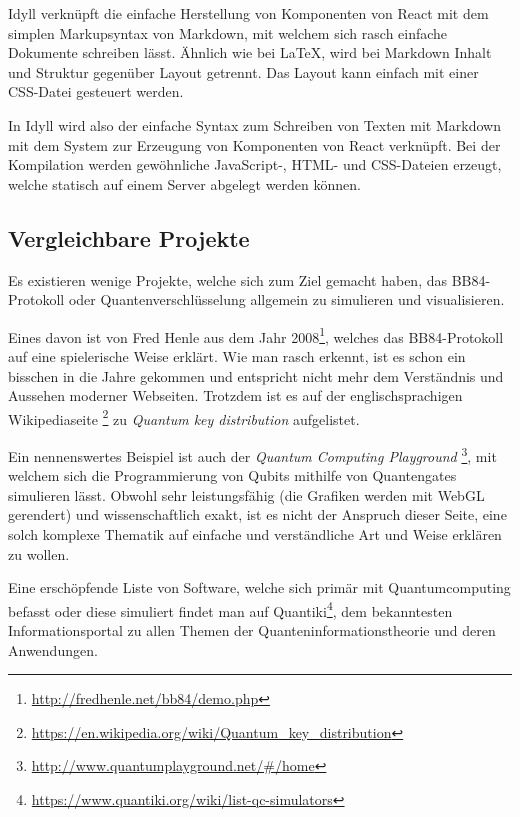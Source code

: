 \documentclass[a4paper,10.2pt,pdftex]{scrartcl}%
\begin{document}
Idyll verknüpft die einfache Herstellung von Komponenten von React mit dem simplen Markupsyntax von Markdown, mit welchem sich rasch einfache Dokumente schreiben lässt. Ähnlich wie bei LaTeX, wird bei Markdown Inhalt und Struktur gegenüber Layout getrennt. Das Layout kann einfach mit einer CSS-Datei gesteuert werden.

In Idyll wird also der einfache Syntax zum Schreiben von Texten mit Markdown mit dem System zur Erzeugung von Komponenten von React verknüpft. Bei der Kompilation werden gewöhnliche JavaScript-, HTML- und CSS-Dateien erzeugt, welche statisch auf einem Server abgelegt werden können.
\subsection{Vergleichbare Projekte}
Es existieren wenige Projekte, welche sich zum Ziel gemacht haben, das BB84-Protokoll oder Quantenverschlüsselung allgemein zu simulieren und visualisieren. 

Eines davon ist von Fred Henle aus dem Jahr 2008\footnote{\url{http://fredhenle.net/bb84/demo.php}}, welches das BB84-Protokoll auf eine spielerische Weise erklärt. Wie man rasch erkennt, ist es schon ein bisschen in die Jahre gekommen und entspricht nicht mehr dem Verständnis und Aussehen moderner Webseiten. Trotzdem ist es auf der englischsprachigen Wikipediaseite \footnote{\url{https://en.wikipedia.org/wiki/Quantum_key_distribution}} zu \emph{Quantum key distribution} aufgelistet.

Ein nennenswertes Beispiel ist auch der \emph{Quantum Computing Playground} \footnote{\url{http://www.quantumplayground.net/\#/home}}, mit welchem sich die Programmierung von Qubits mithilfe von Quantengates simulieren lässt. Obwohl sehr leistungsfähig (die Grafiken werden mit WebGL gerendert) und wissenschaftlich exakt, ist es nicht der Anspruch dieser Seite, eine solch komplexe Thematik auf einfache und verständliche Art und Weise erklären zu wollen.

Eine erschöpfende Liste von Software, welche sich primär mit Quantumcomputing befasst oder diese simuliert findet man auf Quantiki\footnote{\url{https://www.quantiki.org/wiki/list-qc-simulators}}, dem bekanntesten Informationsportal zu allen Themen der Quanteninformationstheorie und deren Anwendungen.
\end{document}
